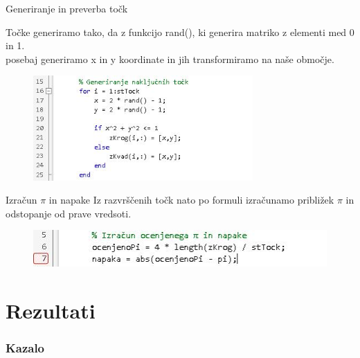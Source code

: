 \documentclass{beamer}
\begin{document}
\begin{frame}{Generiranje in preverba točk}

    Točke generiramo tako, da z funkcijo rand(), ki generira matriko z elementi med 0 in 1.\\
    posebaj generiramo x in y koordinate in jih transformiramo na naše območje.
    
    \begin{figure}
          \centering
          \includegraphics[height=4cm]{generiranje_točk.JPG}
    \end{figure}

\end{frame}

\begin{frame}{Izračun $\pi$ in napake}
    Iz razvrščenih točk nato po formuli izračunamo približek $\pi$ in odstopanje od prave vredsoti.
    
    \begin{figure}
          \centering
          \includegraphics[width=12cm]{izračun.JPG}
    \end{figure}

\end{frame}

\section{Rezultati}

\begin{frame}
    \frametitle{Kazalo}
    \tableofcontents[currentsection]
\end{frame}
\end{document}
